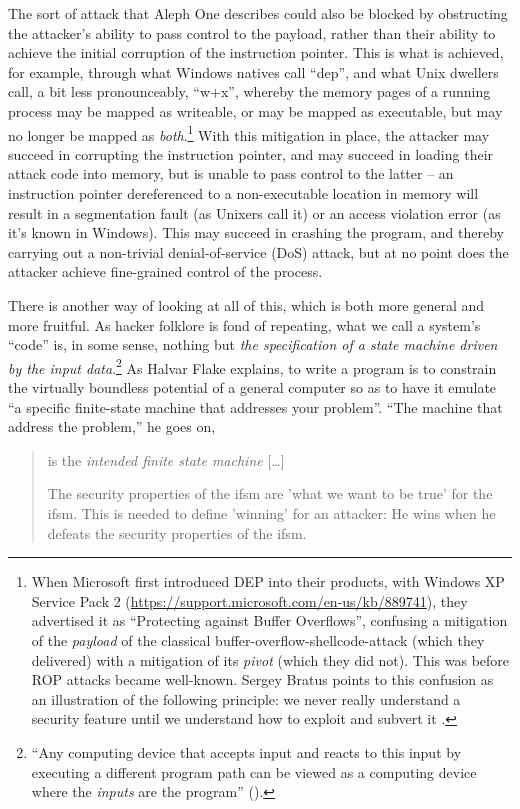 \documentclass[12pt,glossary]{dalthesis}
\begin{document}
The sort of attack that Aleph One describes could also be blocked by
obstructing the attacker's ability to pass control to the payload, rather than
their ability to achieve the initial corruption of the instruction pointer. This
is what is achieved, for example, through what Windows natives call ``\gls{dep}'',
and what Unix dwellers call, a bit less
pronounceably, ``\gls{w+x}'', whereby the memory pages of a
running process may be mapped as writeable, or may be mapped as executable, but
may no longer be mapped as \emph{both}.\footnote{When Microsoft first introduced DEP into their products,
with Windows XP Service Pack 2
(\url{https://support.microsoft.com/en-us/kb/889741}), they advertised it as
``Protecting against Buffer Overflows'', confusing a mitigation of the \emph{payload}
of the classical buffer-overflow-shellcode-attack (which they delivered) with a
mitigation of its \emph{pivot} (which they did not). This was before ROP attacks
became well-known. Sergey Bratus points to this confusion as an illustration of
the following principle: we never really understand a security feature until we
understand how to exploit and subvert it \cite{bratus16}.} With this mitigation
in place, the attacker may succeed in corrupting the instruction pointer, and
may succeed in loading their attack code into memory, but is unable to pass
control to the latter -- an instruction pointer dereferenced to a non-executable
location in memory will result in a segmentation fault (as Unixers call it) or
an access violation error (as it's known in Windows). This may succeed in
crashing the program, and thereby carrying out a non-trivial denial-of-service
(DoS) attack, but at no point does the attacker achieve fine-grained control of
the process.

There is another way of looking at all of this, which is both more general and
more fruitful. As hacker folklore is fond of repeating, what we call a system's
``code'' is, in some sense, nothing but \emph{the specification of a state machine
driven by the input data}.\footnote{``Any computing device that accepts input and reacts to this input
by executing a different program path can be viewed as a computing device where
the \emph{inputs} are the program'' (\cite{flake16}).} As Halvar Flake explains, to write a program
is to constrain the virtually boundless potential of a general computer so as to
have it emulate ``a specific finite-state machine that addresses your problem''.
``The machine that address the problem,'' he goes on,

\begin{quote}
is the \emph{intended finite state machine} [\ldots{}]

The security properties of the \gls{ifsm} are 'what we want to be true' for the
\gls{ifsm}. This is needed to define 'winning' for an attacker: He wins when he
defeats the security properties of the \gls{ifsm}. 
\end{quote}
\end{document}
